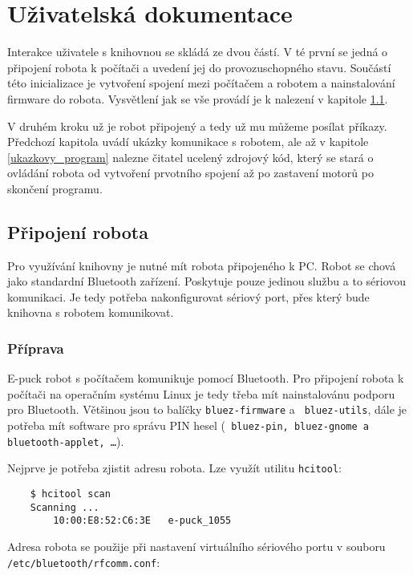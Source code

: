 \chapter{Uživatelská dokumentace}
\label{dokumentace}

    Interakce uživatele s knihovnou se skládá ze dvou částí. V té první se
    jedná o připojení robota k počítači a uvedení jej do provozuschopného
    stavu. Součástí této inicializace je vytvoření spojení mezi počítačem a
    robotem a nainstalování firmware do robota. Vysvětlení jak se vše provádí
    je k nalezení v kapitole \ref{pripojeni_robota}.

    V druhém kroku už je robot připojený a tedy už mu můžeme posílat příkazy.
    Předchozí kapitola uvádí ukázky komunikace s robotem, ale až v kapitole
    \ref{ukazkovy_program} nalezne čitatel ucelený zdrojový kód, který se stará
    o ovládání robota od vytvoření prvotního spojení až po zastavení motorů po
    skončení programu.

    \section{Připojení robota}
    \label{pripojeni_robota}

    Pro využívání knihovny je nutné mít robota připojeného k PC. Robot se chová
    jako standardní Bluetooth zařízení. Poskytuje pouze jedinou službu a to
    sériovou komunikaci. Je tedy potřeba nakonfigurovat sériový port, přes
    který bude knihovna s robotem komunikovat.

    \subsection{Příprava}

    E-puck robot s počítačem komunikuje pomocí Bluetooth. Pro připojení robota
    k počítači na operačním systému Linux je tedy třeba mít nainstalovánu
    podporu pro Bluetooth. Většinou jsou to balíčky {\tt bluez-firmware} a {\tt
    bluez-utils}, dále je potřeba mít software pro správu PIN hesel ({\tt
    bluez-pin, bluez-gnome a bluetooth-applet, \ldots}).

    Nejprve je potřeba zjistit adresu robota. Lze využít utilitu {\tt hcitool}:

    \begin{verbatim}
    $ hcitool scan
    Scanning ...
        10:00:E8:52:C6:3E	e-puck_1055
    \end{verbatim}

    Adresa robota se použije při nastavení virtuálního sériového portu v
    souboru {\tt /etc/bluetooth/rfcomm.conf}:

